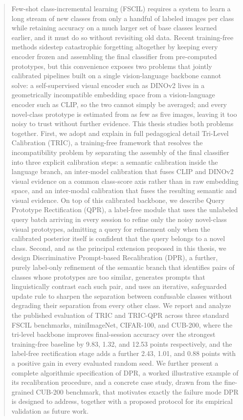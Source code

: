 \documentclass{iutbscthesis}
\begin{document}
\begin{abstract}
Few-shot class-incremental learning (FSCIL) requires a system to learn a long stream of new classes from only a handful of labeled images per class while retaining accuracy on a much larger set of base classes learned earlier, and it must do so without revisiting old data. Recent training-free methods sidestep catastrophic forgetting altogether by keeping every encoder frozen and assembling the final classifier from pre-computed prototypes, but this convenience exposes two problems that jointly calibrated pipelines built on a single vision-language backbone cannot solve: a self-supervised visual encoder such as DINOv2 lives in a geometrically incompatible embedding space from a vision-language encoder such as CLIP, so the two cannot simply be averaged; and every novel-class prototype is estimated from as few as five images, leaving it too noisy to trust without further evidence. This thesis studies both problems together. First, we adopt and explain in full pedagogical detail Tri-Level Calibration (TRIC), a training-free framework that resolves the incompatibility problem by separating the assembly of the final classifier into three explicit calibration steps: a semantic calibration inside the language branch, an inter-model calibration that fuses CLIP and DINOv2 visual evidence on a common class-score axis rather than in raw embedding space, and an inter-modal calibration that fuses the resulting semantic and visual evidence. On top of this calibrated backbone, we describe Query Prototype Rectification (QPR), a label-free module that uses the unlabeled query batch arriving in every session to refine only the noisy novel-class visual prototypes, admitting a query for refinement only when the calibrated posterior itself is confident that the query belongs to a novel class. Second, and as the principal extension proposed in this thesis, we design Discriminative Prompt-based Recalibration (DPR), a further, purely label-only refinement of the semantic branch that identifies pairs of classes whose prototypes are too similar, generates prompts that linguistically contrast each such pair, and uses an iterative, safeguarded update rule to sharpen the separation between confusable classes without degrading their separation from every other class. We report and analyze the published evaluation of TRIC and TRIC-QPR across three standard FSCIL benchmarks, miniImageNet, CIFAR-100, and CUB-200, where the tri-level backbone improves final-session accuracy over the strongest training-free baseline by 9.83, 1.32, and 12.53 points respectively, and the label-free rectification stage adds a further 2.43, 1.01, and 0.88 points with a positive gain in every evaluated random seed. We further present a complete algorithmic specification of DPR, a worked illustrative example of its recalibration procedure, and a concrete case study, drawn from the fine-grained CUB-200 benchmark, that motivates exactly the failure mode DPR is designed to address, together with a proposed protocol for its empirical validation as future work.
\end{abstract}
\end{document}
